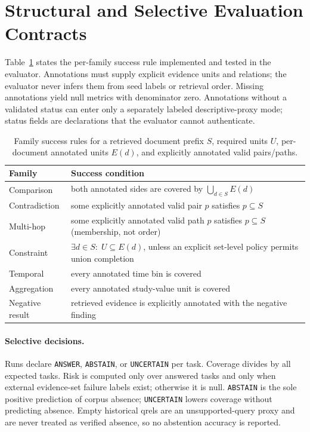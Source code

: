 \section{Structural and Selective Evaluation Contracts}
\label{app:contracts}
Table~\ref{tab:success} states the per-family success rule implemented and tested in the evaluator. Annotations must supply explicit evidence units and relations; the evaluator never infers them from seed labels or retrieval order. Missing annotations yield null metrics with denominator zero. Annotations without a validated status can enter only a separately labeled descriptive-proxy mode; status fields are declarations that the evaluator cannot authenticate.

\begin{table}[h]
\centering
\small
\caption{Family success rules for a retrieved document prefix $S$, required units $U$, per-document annotated units $E(d)$, and explicitly annotated valid pairs/paths.}
\label{tab:success}
\begin{tabular}{@{}l>{\raggedright\arraybackslash}p{9.4cm}@{}}
\toprule
Family & Success condition \\
\midrule
Comparison & both annotated sides are covered by $\bigcup_{d\in S}E(d)$ \\
Contradiction & some explicitly annotated valid pair $p$ satisfies $p\subseteq S$ \\
Multi-hop & some explicitly annotated valid path $p$ satisfies $p\subseteq S$ (membership, not order) \\
Constraint & $\exists d\in S:\;U\subseteq E(d)$, unless an explicit set-level policy permits union completion \\
Temporal & every annotated time bin is covered \\
Aggregation & every annotated study-value unit is covered \\
Negative result & retrieved evidence is explicitly annotated with the negative finding \\
\bottomrule
\end{tabular}
\end{table}

\paragraph{Selective decisions.}
Runs declare \texttt{ANSWER}, \texttt{ABSTAIN}, or \texttt{UNCERTAIN} per task. Coverage divides by all expected tasks. Risk is computed only over answered tasks and only when external evidence-set failure labels exist; otherwise it is null. \texttt{ABSTAIN} is the sole positive prediction of corpus absence; \texttt{UNCERTAIN} lowers coverage without predicting absence. Empty historical qrels are an unsupported-query proxy and are never treated as verified absence, so no abstention accuracy is reported.

